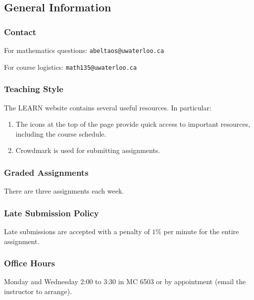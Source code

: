 
\subsection{General Information}

\subsubsection{Contact}
For mathematics questions: \texttt{abeltaos@uwaterloo.ca}

For course logistics: \texttt{math135@uwaterloo.ca}

\subsubsection{Teaching Style}
The LEARN website contains several useful resources. In particular:
\begin{enumerate}
    \item The icons at the top of the page provide quick access to important resources, including the course schedule.
    \item Crowdmark is used for submitting assignments.
\end{enumerate}

\subsubsection{Graded Assignments}
There are three assignments each week.

\subsubsection{Late Submission Policy}
Late submissions are accepted with a penalty of $1\%$ per minute for the entire assignment.

\subsubsection{Office Hours}
Monday and Wednesday 2:00 to 3:30 in MC 6503 or by appointment (email the instructor to arrange).
